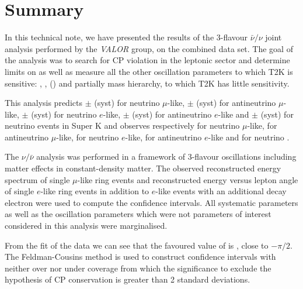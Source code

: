 \clearpage


\section{Summary}
\label{sec:summary}

In this technical note, we have presented the results of the 3-flavour $\bar{\nu}/\nu$ joint analysis performed by the {\em VALOR} group, on the combined \RunPeriod data set. The goal of the analysis was to search for CP violation in the leptonic sector and determine limits on \deltacp as well as measure all the other oscillation parameters to which T2K is sensitive: \ssqthonethree, \ssqthtwothree, \dmsqtwothree (\dmsqonethree) and partially mass hierarchy, to which T2K has little sensitivity.

This analysis predicts
\NskOscExpectationNumu{} $\pm$ \NskOscExpectationNumuError{} (syst) for neutrino $\mu$-like, \NskOscExpectationNumuBar{} $\pm$ \NskOscExpectationNumuBarError{} (syst) for antineutrino $\mu$-like, \NskOscExpectationNue{} $\pm$ \NskOscExpectationNueError{} (syst) for neutrino $e$-like, \NskOscExpectationNueBar{} $\pm$ \NskOscExpectationNueBarError{} (syst) for antineutrino $e$-like and \NskOscExpectationNueCConepi{} $\pm$ \NskOscExpectationNueCConepiError{} (syst) for neutrino \nueCConepi{} events in Super K and observes respectively \NskObservedNumu{} for neutrino $\mu$-like, \NskObservedNumuBar{}  for antineutrino $\mu$-like, \NskObservedNue{}  for neutrino $e$-like, \NskObservedNueBar{}  for antineutrino $e$-like and \NskObservedNueCConepi{} for neutrino \nueCConepi{}. 

The $\nu/\bar{\nu}$ analysis was performed in a framework of 3-flavour oscillations including matter effects in constant-density matter. The observed reconstructed energy spectrum of single $\mu$-like ring events and reconstructed energy versus lepton angle of single $e$-like ring events in addition to $e$-like events with an additional decay electron were used to compute the confidence intervals. All \NSyst{} systematic parameters as well as the oscillation parameters which were not parameters of interest considered in this analysis were marginalised.

From the fit of the \RunPeriod data we can see that the favoured value of \deltacp is \BestFitDeltacpwRC, close to $-\pi/2$. The Feldman-Cousins method is used to construct confidence intervals with neither over nor under coverage from which the significance to exclude the hypothesis of CP conservation is greater than 2 standard deviations.
\clearpage

